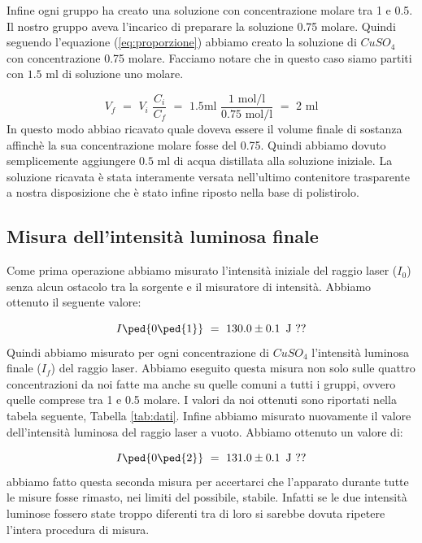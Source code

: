 Infine ogni gruppo ha creato una soluzione con concentrazione molare tra 1 e 0.5. Il nostro gruppo aveva l'incarico di preparare la soluzione 0.75 molare.
Quindi seguendo l'equazione (\ref{eq:proporzione}) abbiamo creato la soluzione di $CuSO_4$ con concentrazione 0.75 molare. Facciamo notare che in questo caso siamo partiti con $1.5\,\,\si{\milli\litre}$ di soluzione uno molare. 

\begin{equation*}
	V_f \,\, = \,\, V_i \,\, \frac{C_i}{C_f} \,\, = \,\, 1.5 \si{\milli\litre} \,\, \frac{1 \,\, \si{\mole\per\litre}}{0.75 \,\, \si{\mole\per\litre}} \,\, = \,\, 2 \,\, \si{\milli\litre}
\end{equation*}
%
In questo modo abbiao ricavato quale doveva essere il volume finale di sostanza affinchè la sua concentrazione molare fosse del 0.75. Quindi abbiamo dovuto semplicemente aggiungere $0.5\,\,\si{\milli\litre}$ di acqua distillata alla soluzione iniziale.
La soluzione ricavata è stata interamente versata nell'ultimo contenitore trasparente a nostra disposizione che è stato infine riposto nella base di polistirolo.

\subsection{Misura dell'intensità luminosa finale}

Come prima operazione abbiamo misurato l'intensità iniziale del raggio laser ($I_0$) senza alcun ostacolo tra la sorgente e il misuratore di intensità. Abbiamo ottenuto il seguente valore:

\begin{equation*}
	I\ped{0\ped{1}} \,\,=\,\, 130.0 \pm 0.1 \,\,\, \si{\joule} \,\, ??
\end{equation*}
%
Quindi abbiamo misurato per ogni concentrazione di $CuSO_4$ l'intensità luminosa finale ($I_f$) del raggio laser. Abbiamo eseguito questa misura non solo sulle quattro concentrazioni da noi fatte ma anche su quelle comuni a tutti i gruppi, ovvero quelle comprese tra 1 e 0.5 molare. I valori da noi ottenuti sono riportati nella tabela seguente, Tabella \ref{tab:dati}.
Infine abbiamo misurato nuovamente il valore dell'intensità luminosa del raggio laser a vuoto. Abbiamo ottenuto un valore di:

\begin{equation*}
	I\ped{0\ped{2}} \,\,=\,\, 131.0 \pm 0.1 \,\,\, \si{\joule} \,\, ??
\end{equation*}
%
abbiamo fatto questa seconda misura per accertarci che l'apparato durante tutte le misure fosse rimasto, nei limiti del possibile, stabile. Infatti se le due intensità luminose fossero state troppo diferenti tra di loro si sarebbe dovuta ripetere l'intera procedura di misura.

